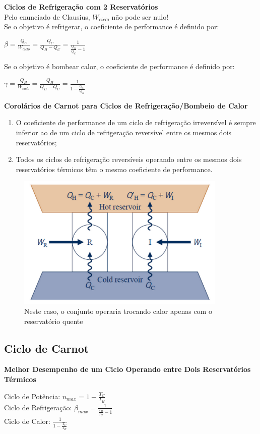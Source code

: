 \documentclass[a4paper, 12pt]{article}
\begin{document}
\newpage
\textbf{Ciclos de Refrigeração com 2 Reservatórios}\\
Pelo enunciado de Clausius, $ W_{ciclo} $ não pode ser nulo!\\

Se o objetivo é refrigerar, o coeficiente
de performance é definido por:
	\begin{center}
		\large
		$ \beta = \frac{Q_C}{W_{ciclo}} =  \frac{Q_C}{Q_H - Q_C} = \frac{1}{\frac{Q_H}{Q_C} - 1}$
	\end{center}
Se o objetivo é bombear calor, o coeficiente
de performance é definido por:
	\begin{center}
		\large
		$ \gamma = \frac{Q_H}{W_{ciclo}} = \frac{Q_H}{Q_H - Q_C} = \frac{1}{1 - \frac{Q_C}{Q_H}}$
	\end{center}
	
\textbf{Corolários de Carnot para Ciclos de Refrigeração/Bombeio de Calor}
	\begin{enumerate}
		\item O coeficiente de performance de um ciclo de refrigeração irreversível é
		sempre inferior ao de um ciclo de refrigeração reversível entre os mesmos
		dois reservatórios;
		\item Todos os ciclos de refrigeração reversíveis operando entre os mesmos
		dois reservatórios térmicos têm o mesmo coeficiente de performance.
	\end{enumerate}
	
	\begin{figure}[h]
		\includegraphics[width = 10cm]{rb.png}
		\centering
		\caption{Neste caso, o conjunto 
			operaria trocando calor apenas com o
			reservatório quente}
	\end{figure}
	
\newpage
\subsection{Ciclo de Carnot}
\textbf{Melhor Desempenho de um Ciclo Operando entre Dois Reservatórios Térmicos}
	\begin{center}
		\large
		Ciclo de Potência: $ n_{max} = 1 - \frac{T_C}{T_H} $\\
		Ciclo de Refrigeração: $ \beta_{max} =  \frac{1}{\frac{T_H}{T_C} - 1} $\\
		Ciclo de Calor: $ \frac{1}{1 - \frac{T_C}{T_H}} $
	\end{center}
	
\end{document}

